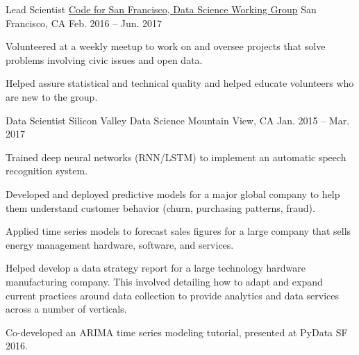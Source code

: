 \begin{cventries}
  \cventry
    {Lead Scientist} %
    {\href{https://github.com/sfbrigade/data-science-wg}{Code for San Francisco, Data Science Working Group}} %
    {San Francisco, CA} %
    {Feb. 2016 -- Jun. 2017} %
    {
      \begin{cvitems} %
        \item {Volunteered at a weekly meetup to work on and oversee projects that solve problems involving civic issues and open data.}
        \item {Helped assure statistical and technical quality and helped educate volunteers who are new to the group.}
      \end{cvitems}
    }

  \cventry
    {Data Scientist} %
    {Silicon Valley Data Science} %
    {Mountain View, CA} %
    {Jan. 2015 -- Mar. 2017} %
    {
      \begin{cvitems} %
        \item {Trained deep neural networks (RNN/LSTM) to implement an automatic speech recognition system.}
        \item {Developed and deployed predictive models for a major global company to help them understand customer behavior (churn, purchasing patterns, fraud).}
        \item {Applied time series models to forecast sales figures for a large company that sells energy management hardware, software, and services.}
        \item {Helped develop a data strategy report for a large technology hardware manufacturing company. This involved detailing how to adapt and expand current practices around data collection to provide analytics and data services across a number of verticals.}
        \item {Co-developed an ARIMA time series modeling tutorial, presented at PyData SF 2016.}
      \end{cvitems}
    }


\end{cventries}
